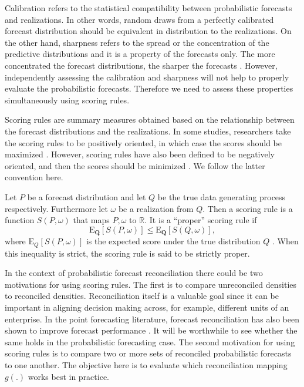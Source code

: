 \documentclass[a4paper, 11pt]{article}
\def\E{\text{E}}
\theoremstyle{definition}
\begin{document}
Calibration refers to the statistical compatibility between probabilistic forecasts and realizations. In other words, random draws from a perfectly calibrated forecast distribution should be equivalent in distribution to the realizations. On the other hand, sharpness refers to the spread or the concentration of the predictive distributions and it is a property of the forecasts only. The more concentrated the forecast distributions, the sharper the forecasts \citep{Gneiting2008}. However, independently assessing the calibration and sharpness will not help to properly evaluate the probabilistic forecasts. Therefore we need to assess these properties simultaneously using scoring rules.

Scoring rules are summary measures obtained based on the relationship between the forecast distributions and the realizations. In some studies, researchers take the scoring rules to be positively oriented, in which case the scores should be maximized \citep{Gneiting2007}. However, scoring rules have also been defined to be negatively oriented, and then the scores should be minimized \citep{Gneiting2014}. We follow the latter convention here.

Let $P$ be a forecast distribution and let $Q$ be the true data generating process respectively. Furthermore let $\omega$ be a realization from $Q$. Then a scoring rule is a function $S(P,\omega)$ that maps $P,\omega$ to $\mathbb{R}$. It is a ``proper'' scoring rule if
\begin{equation}\label{eq:(3.1.)}
\E_{\bm{Q}}[S(P,\omega)] \le \E_{\bm{Q}}[S(Q,\omega)],
\end{equation}
where $\E_{Q}[S(P,\omega)]$ is the expected score under the true distribution $Q$ \citep{Gneiting2008, Gneiting2014}. When this inequality is strict, the scoring rule is said to be strictly proper.

In the context of probabilistic forecast reconciliation there could be two motivations for using scoring rules. The first is to compare unreconciled densities to reconciled densities. Reconciliation itself is a valuable goal since it can be important in aligning decision making across, for example, different units of an enterprise. In the point forecasting literature, forecast reconciliation has also been shown to improve forecast performance \citep{AthEtAl2017, Wickramasuriya2017}. It will be worthwhile to see whether the same holds in the probabilistic forecasting case. The second motivation for using scoring rules is to compare two or more sets of reconciled probabilistic forecasts to one another. The objective here is to evaluate which reconciliation mapping $g(.)$ works best in practice.
\end{document}
